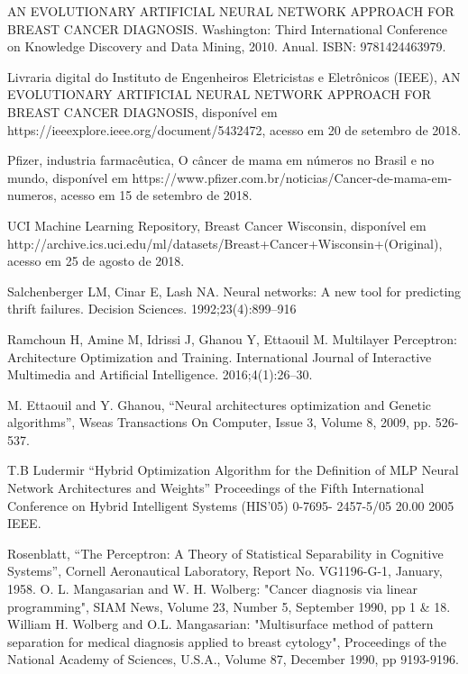 \documentclass[conference]{IEEEtran}
\begin{document}
\begin{thebibliography}{00}

 AN EVOLUTIONARY ARTIFICIAL NEURAL NETWORK APPROACH FOR BREAST CANCER DIAGNOSIS. Washington: Third International Conference on Knowledge Discovery and Data Mining, 2010. Anual. ISBN: 9781424463979.

 Livraria digital do Instituto de Engenheiros Eletricistas e Eletrônicos (IEEE), AN EVOLUTIONARY ARTIFICIAL NEURAL NETWORK APPROACH FOR BREAST CANCER DIAGNOSIS, disponível em https://ieeexplore.ieee.org/document/5432472, acesso em 20 de setembro de 2018.

 Pfizer, industria farmacêutica, O câncer de mama em números no Brasil e no mundo, disponível em https://www.pfizer.com.br/noticias/Cancer-de-mama-em-numeros, acesso em 15 de setembro de 2018.

 UCI Machine Learning Repository, Breast Cancer Wisconsin, disponível em http://archive.ics.uci.edu/ml/datasets/Breast+Cancer+Wisconsin+(Original), acesso em 25 de agosto de 2018.

 Salchenberger LM, Cinar E, Lash NA. Neural networks: A new tool for predicting thrift failures. Decision Sciences. 1992;23(4):899–916

 Ramchoun H, Amine M, Idrissi J, Ghanou Y, Ettaouil M. Multilayer Perceptron: Architecture Optimization and Training. International Journal of Interactive Multimedia and Artificial Intelligence. 2016;4(1):26–30.

 M. Ettaouil and Y. Ghanou, “Neural architectures optimization and Genetic algorithms”, Wseas Transactions On Computer, Issue 3, Volume 8, 2009, pp. 526-537. 

 T.B Ludermir “Hybrid Optimization Algorithm for the Definition of MLP Neural Network Architectures and Weights” Proceedings of the Fifth International Conference on Hybrid Intelligent Systems (HIS’05) 0-7695- 2457-5/05 20.00 2005 IEEE.

 Rosenblatt, “The Perceptron: A Theory of Statistical Separability in Cognitive Systems”, Cornell Aeronautical Laboratory, Report No. VG1196-G-1, January, 1958. 
 O. L. Mangasarian and W. H. Wolberg: "Cancer          diagnosis via linear 
      programming", SIAM News, Volume 23, Number 5, September 1990, pp 1 & 18.
 William H. Wolberg and O.L. Mangasarian: "Multisurface method of 
      pattern separation for medical diagnosis applied to breast cytology", 
      Proceedings of the National Academy of Sciences, U.S.A., Volume 87, 
      December 1990, pp 9193-9196.
\end{thebibliography}
\end{document}
